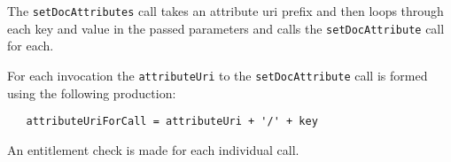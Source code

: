 The \verb+setDocAttributes+ call takes an attribute uri prefix and then loops through
each key and value in the passed parameters and calls the \verb+setDocAttribute+ call for each.

For each invocation the \verb+attributeUri+ to the \verb+setDocAttribute+ call is formed using
the following production:

\begin{verbatim}
   attributeUriForCall = attributeUri + '/' + key
\end{verbatim}

An entitlement check is made for each individual call.
